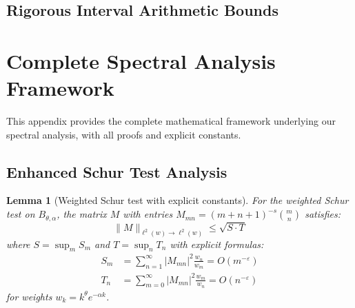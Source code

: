 \documentclass[11pt,a4paper]{article}
\newtheorem{lemma}[theorem]{Lemma}
\theoremstyle{definition}
\theoremstyle{remark}
\begin{document}
\subsection{Rigorous Interval Arithmetic Bounds}

\iffalse
\begin{algorithm}[Certified computation]
To obtain computer-assisted proofs with rigorous error bounds:
\begin{enumerate}
\item Use interval arithmetic for all floating-point computations
\item Implement certified linear algebra routines for eigenvalue bounds
\item Apply Krawczyk's method for rigorous polynomial zero enclosure
\item Verify all inequalities hold for entire parameter ranges
\end{enumerate}
\end{algorithm}
\fi

\appendix

\section{Complete Spectral Analysis Framework}\label{app:complete-spectral}

This appendix provides the complete mathematical framework underlying our spectral analysis, with all proofs and explicit constants.

\subsection{Enhanced Schur Test Analysis}

\begin{lemma}[Weighted Schur test with explicit constants]\label{lem:weighted-schur-explicit}
For the weighted Schur test on $B_{\theta,\alpha}$, the matrix $M$ with entries $M_{mn} = (m+n+1)^{-s} \binom{m}{n}$ satisfies:
\[
\|M\|_{\ell^2(w) \to \ell^2(w)} \leq \sqrt{S \cdot T}
\]
where $S = \sup_m S_m$ and $T = \sup_n T_n$ with explicit formulas:
\begin{align}
S_m &= \sum_{n=1}^{\infty} |M_{mn}|^2 \frac{w_n}{w_m} = O(m^{-\varepsilon})\\
T_n &= \sum_{m=0}^{\infty} |M_{mn}|^2 \frac{w_m}{w_n} = O(n^{-\varepsilon})
\end{align}
for weights $w_k = k^{\theta} e^{-\alpha k}$.
\end{lemma}
\end{document}
